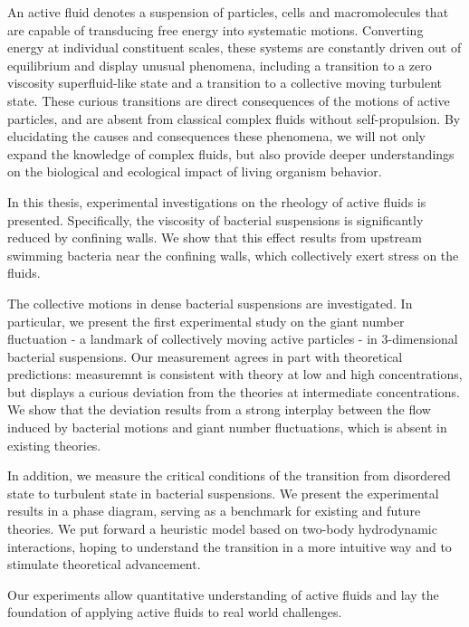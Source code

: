 
An active fluid denotes a suspension of particles, cells and macromolecules that are capable of transducing free energy into systematic motions. Converting energy at individual constituent scales, these systems are constantly driven out of equilibrium and display unusual phenomena, including a transition to a zero viscosity superfluid-like state and a transition to a collective moving turbulent state. These curious transitions are direct consequences of the motions of active particles, and are absent from classical complex fluids without self-propulsion. By elucidating the causes and consequences these phenomena, we will not only expand the knowledge of complex fluids, but also provide deeper understandings on the biological and ecological impact of living organism behavior.

In this thesis, experimental investigations on the rheology of active fluids is presented. Specifically, the viscosity of bacterial suspensions is significantly reduced by confining walls. We show that this effect results from upstream swimming bacteria near the confining walls, which collectively exert stress on the fluids.

The collective motions in dense bacterial suspensions are investigated. In particular, we present the first experimental study on the giant number fluctuation - a landmark of collectively moving active particles - in 3-dimensional bacterial suspensions. Our measurement agrees in part with theoretical predictions: measuremnt is consistent with theory at low and high concentrations, but displays a curious deviation from the theories at intermediate concentrations. We show that the deviation results from a strong interplay between the flow induced by bacterial motions and giant number fluctuations, which is absent in existing theories.

In addition, we measure the critical conditions of the transition from disordered state to turbulent state in bacterial suspensions. We present the experimental results in a phase diagram, serving as a benchmark for existing and future theories. We put forward a heuristic model based on two-body hydrodynamic interactions, hoping to understand the transition in a more intuitive way and to stimulate theoretical advancement.

Our experiments allow quantitative understanding of active fluids and lay the foundation of applying active fluids to real world challenges.
